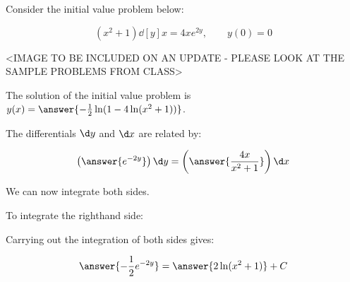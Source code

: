 \documentclass{ximera}
\author{Jim Talamo}
\begin{document}
\begin{exercise}
Consider the initial value problem below:

\[
(x^2+1) \dd[y]{x} = 4xe^{2y}  , \qquad y(0)=0
\]

<IMAGE TO BE INCLUDED ON AN UPDATE - PLEASE LOOK AT THE SAMPLE PROBLEMS FROM CLASS>
%
%



The solution of the initial value problem is $y(x) = \answer{-\frac{1}{2}\ln(1-4 \ln(x^2+1))  }$.

\begin{hint}
The differentials $\d y$ and $\d x$ are related by:

\[
\left(\answer{e^{-2y}} \right) \d y = \left(\answer{ \frac{4x}{x^2+1} } \right) \d x
\]

\begin{question}
We can now integrate both sides.

To integrate the righthand side:

\begin{multipleChoice}
\end{multipleChoice}

Carrying out the integration of both sides gives:

\begin{align*}
\answer{-\frac{1}{2}e^{-2y}} &= \answer{2 \ln(x^2+1)} +C\\
\end{align*}


\end{question}
\end{hint}
\end{exercise}
\end{document}
